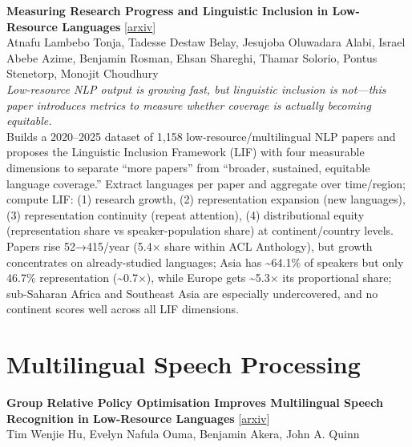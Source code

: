 \documentclass[12pt,letterpaper]{article}
\begin{document}
\medskip

{\small\textbf{Measuring Research Progress and Linguistic Inclusion in Low-Resource Languages}} {\scriptsize[\href{https://arxiv.org/abs/2610.30296}{arxiv}]}\\
{\scriptsize Atnafu Lambebo Tonja, Tadesse Destaw Belay, Jesujoba Oluwadara Alabi, Israel Abebe Azime, Benjamin Rosman, Ehsan Shareghi, Thamar Solorio, Pontus Stenetorp, Monojit Choudhury}\\

{\small\textit{Low-resource NLP output is growing fast, but linguistic inclusion is not---this paper introduces metrics to measure whether coverage is actually becoming equitable.}}\\[1pt]
{\footnotesize Builds a 2020--2025 dataset of 1,158 low-resource/multilingual NLP papers and proposes the Linguistic Inclusion Framework (LIF) with four measurable dimensions to separate ``more papers'' from ``broader, sustained, equitable language coverage.'' Extract languages per paper and aggregate over time/region; compute LIF: (1) research growth, (2) representation expansion (new languages), (3) representation continuity (repeat attention), (4) distributional equity (representation share vs speaker-population share) at continent/country levels. Papers rise 52→415/year (5.4× share within ACL Anthology), but growth concentrates on already-studied languages; Asia has \textasciitilde{}64.1\% of speakers but only 46.7\% representation (\textasciitilde{}0.7×), while Europe gets \textasciitilde{}5.3× its proportional share; sub-Saharan Africa and Southeast Asia are especially undercovered, and no continent scores well across all LIF dimensions.}

\medskip


\section*{Multilingual Speech Processing}

{\small\textbf{Group Relative Policy Optimisation Improves Multilingual Speech Recognition in Low-Resource Languages}} {\scriptsize[\href{https://arxiv.org/abs/2610.30663}{arxiv}]}\\
{\scriptsize Tim Wenjie Hu, Evelyn Nafula Ouma, Benjamin Akera, John A. Quinn}\\
\end{document}
